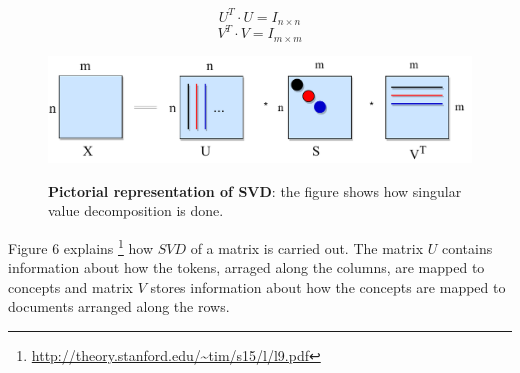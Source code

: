     \begin{equation}
    U^T \cdot U = I_{n \times n}
    \end{equation}
    \begin{equation}
    V^T \cdot V = I_{m \times m}
    \end{equation}
    
\begin{figure}[h]
\begin{centering}
    {\includegraphics[scale=0.8]{figures/usv.pdf}}
    \caption[Pictorial representation of SVD]{\textbf{Pictorial representation of SVD}: the figure shows how singular value decomposition is done.}
\end{centering}
\end{figure}
    
    Figure 6 explains \footnote{\url{http://theory.stanford.edu/~tim/s15/l/l9.pdf}} 
    how $SVD$ of a matrix is carried out. The matrix $U$ contains information about how the tokens, arraged along the columns, are mapped to concepts and matrix $V$ stores information about how the concepts are mapped to documents arranged along the rows. 
    
